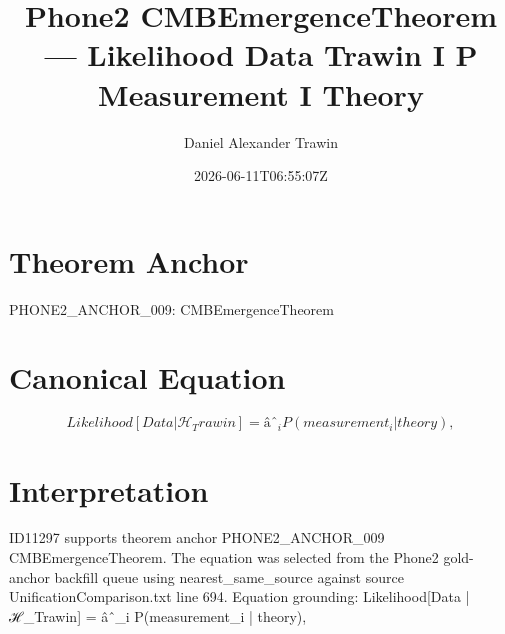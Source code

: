 \documentclass[11pt]{article}
\title{Phone2 CMBEmergenceTheorem — Likelihood Data Trawin I P Measurement I Theory}
\author{Daniel Alexander Trawin}
\date{2026-06-11T06:55:07Z}
\begin{document}
\maketitle
\section*{Theorem Anchor}
PHONE2_ANCHOR_009: CMBEmergenceTheorem
\section*{Canonical Equation}
\[
Likelihood[Data | ℋ_Trawin] = âˆ_i P(measurement_i | theory),
\]
\section*{Interpretation}
ID11297 supports theorem anchor PHONE2_ANCHOR_009 CMBEmergenceTheorem. The equation was selected from the Phone2 gold-anchor backfill queue using nearest_same_source against source UnificationComparison.txt line 694. Equation grounding: Likelihood[Data | ℋ_Trawin] = âˆ_i P(measurement_i | theory),
\end{document}
